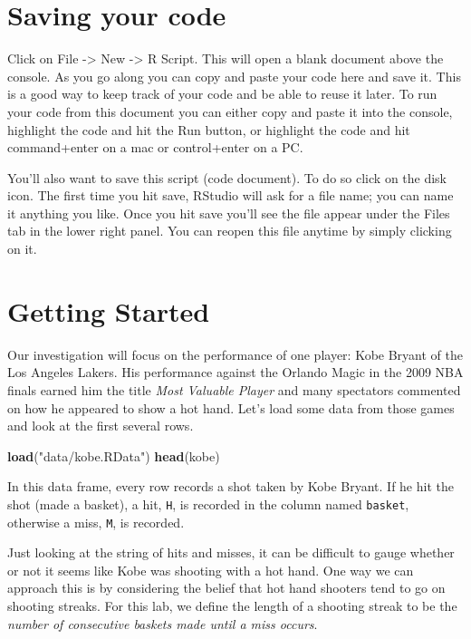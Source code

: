 \documentclass[]{book}
\newenvironment{Shaded}{\begin{snugshade}}{\end{snugshade}}
\newcommand{\KeywordTok}[1]{\textcolor[rgb]{0.13,0.29,0.53}{\textbf{{#1}}}}
\newcommand{\StringTok}[1]{\textcolor[rgb]{0.31,0.60,0.02}{{#1}}}
\newcommand{\NormalTok}[1]{{#1}}
\theoremstyle{definition}
\theoremstyle{definition}
\theoremstyle{remark}
\begin{document}
\section*{Saving your code}\label{saving-your-code}

Click on File -\textgreater{} New -\textgreater{} R Script. This will
open a blank document above the console. As you go along you can copy
and paste your code here and save it. This is a good way to keep track
of your code and be able to reuse it later. To run your code from this
document you can either copy and paste it into the console, highlight
the code and hit the Run button, or highlight the code and hit
command+enter on a mac or control+enter on a PC.

You'll also want to save this script (code document). To do so click on
the disk icon. The first time you hit save, RStudio will ask for a file
name; you can name it anything you like. Once you hit save you'll see
the file appear under the Files tab in the lower right panel. You can
reopen this file anytime by simply clicking on it.

\section*{Getting Started}\label{getting-started}

Our investigation will focus on the performance of one player: Kobe
Bryant of the Los Angeles Lakers. His performance against the Orlando
Magic in the 2009 NBA finals earned him the title \emph{Most Valuable
Player} and many spectators commented on how he appeared to show a hot
hand. Let's load some data from those games and look at the first
several rows.

\begin{Shaded}
\begin{Highlighting}[]
\KeywordTok{load}\NormalTok{(}\StringTok{"data/kobe.RData"}\NormalTok{)}
\KeywordTok{head}\NormalTok{(kobe)}
\end{Highlighting}
\end{Shaded}

In this data frame, every row records a shot taken by Kobe Bryant. If he
hit the shot (made a basket), a hit, \texttt{H}, is recorded in the
column named \texttt{basket}, otherwise a miss, \texttt{M}, is recorded.

Just looking at the string of hits and misses, it can be difficult to
gauge whether or not it seems like Kobe was shooting with a hot hand.
One way we can approach this is by considering the belief that hot hand
shooters tend to go on shooting streaks. For this lab, we define the
length of a shooting streak to be the \emph{number of consecutive
baskets made until a miss occurs}.
\end{document}
